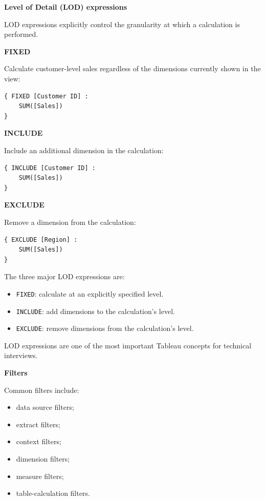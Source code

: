 \documentclass[11pt,letterpaper]{article}
\begin{document}

\textbf{Level of Detail (LOD) expressions}

LOD expressions explicitly control the granularity at which a calculation is
performed.

\textbf{FIXED}

Calculate customer-level sales regardless of the dimensions currently shown in
the view:

\begin{lstlisting}
{ FIXED [Customer ID] :
    SUM([Sales])
}
\end{lstlisting}

\textbf{INCLUDE}

Include an additional dimension in the calculation:

\begin{lstlisting}
{ INCLUDE [Customer ID] :
    SUM([Sales])
}
\end{lstlisting}

\textbf{EXCLUDE}

Remove a dimension from the calculation:

\begin{lstlisting}
{ EXCLUDE [Region] :
    SUM([Sales])
}
\end{lstlisting}

The three major LOD expressions are:

\begin{itemize}[leftmargin=*]
    \item \texttt{FIXED}: calculate at an explicitly specified level.
    \item \texttt{INCLUDE}: add dimensions to the calculation's level.
    \item \texttt{EXCLUDE}: remove dimensions from the calculation's level.
\end{itemize}

LOD expressions are one of the most important Tableau concepts for technical
interviews.



\textbf{Filters}

Common filters include:

\begin{itemize}[leftmargin=*]
    \item data source filters;
    \item extract filters;
    \item context filters;
    \item dimension filters;
    \item measure filters;
    \item table-calculation filters.
\end{itemize}
\end{document}
